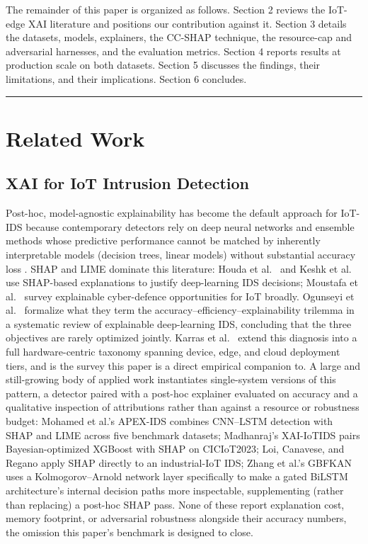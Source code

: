The remainder of this paper is organized as follows. Section 2 reviews the IoT-edge XAI literature and positions our contribution against it. Section 3 details the datasets, models, explainers, the CC-SHAP technique, the resource-cap and adversarial harnesses, and the evaluation metrics. Section 4 reports results at production scale on both datasets. Section 5 discusses the findings, their limitations, and their implications. Section 6 concludes.

\begin{center}\rule{0.5\linewidth}{0.5pt}\end{center}

\section{Related Work}\label{related-work}

\subsection{XAI for IoT Intrusion Detection}\label{xai-for-iot-intrusion-detection}

Post-hoc, model-agnostic explainability has become the default approach for IoT-IDS because contemporary detectors rely on deep neural networks and ensemble methods whose predictive performance cannot be matched by inherently interpretable models (decision trees, linear models) without substantial accuracy loss \citep{ref1}. SHAP \citep{ref3} and LIME \citep{ref4} dominate this literature: Houda et al.~\citep{ref11} and Keshk et al.~\citep{ref12} use SHAP-based explanations to justify deep-learning IDS decisions; Moustafa et al.~\citep{ref13} survey explainable cyber-defence opportunities for IoT broadly. Ogunseyi et al.~\citep{ref14} formalize what they term the accuracy--efficiency--explainability trilemma in a systematic review of explainable deep-learning IDS, concluding that the three objectives are rarely optimized jointly. Karras et al.~\citep{ref1} extend this diagnosis into a full hardware-centric taxonomy spanning device, edge, and cloud deployment tiers, and is the survey this paper is a direct empirical companion to. A large and still-growing body of applied work instantiates single-system versions of this pattern, a detector paired with a post-hoc explainer evaluated on accuracy and a qualitative inspection of attributions rather than against a resource or robustness budget: Mohamed et al.'s APEX-IDS \citep{ref37} combines CNN--LSTM detection with SHAP and LIME across five benchmark datasets; Madhanraj's XAI-IoTIDS \citep{ref39} pairs Bayesian-optimized XGBoost with SHAP on CICIoT2023; Loi, Canavese, and Regano \citep{ref38} apply SHAP directly to an industrial-IoT IDS; Zhang et al.'s GBFKAN \citep{ref29} uses a Kolmogorov--Arnold network layer specifically to make a gated BiLSTM architecture's internal decision paths more inspectable, supplementing (rather than replacing) a post-hoc SHAP pass. None of these report explanation cost, memory footprint, or adversarial robustness alongside their accuracy numbers, the omission this paper's benchmark is designed to close.

